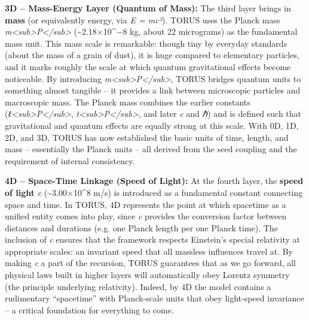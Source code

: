\documentclass[
]{article}
\begin{document}
\textbf{3D -- Mass-Energy Layer (Quantum of Mass):} The third layer
brings in \textbf{mass} (or equivalently energy, via \emph{E = mc²}).
TORUS uses the Planck mass
\emph{m\textless sub\textgreater P\textless/sub\textgreater{}}
(\textasciitilde2.18×10\^{}−8 kg, about 22 micrograms) as the
fundamental mass unit. This mass scale is remarkable: though tiny by
everyday standards (about the mass of a grain of dust), it is huge
compared to elementary particles, and it marks roughly the scale at
which quantum gravitational effects become noticeable. By introducing
\emph{m\textless sub\textgreater P\textless/sub\textgreater{}}, TORUS
bridges quantum units to something almost tangible -- it provides a link
between microscopic particles and macroscopic mass. The Planck mass
combines the earlier constants
(\emph{ℓ\textless sub\textgreater P\textless/sub\textgreater{}},
\emph{t\textless sub\textgreater P\textless/sub\textgreater{}}, and
later \emph{c} and \emph{ℏ}) and is defined such that gravitational and
quantum effects are equally strong at this scale. With 0D, 1D, 2D, and
3D, TORUS has now established the basic units of time, length, and mass
-- essentially the Planck units -- all derived from the seed coupling
and the requirement of internal consistency.

\textbf{4D -- Space-Time Linkage (Speed of Light):} At the fourth layer,
the \textbf{speed of light} \emph{c} (\textasciitilde3.00×10\^{}8 m/s)
is introduced as a fundamental constant connecting space and time. In
TORUS, 4D represents the point at which spacetime as a unified entity
comes into play, since \emph{c} provides the conversion factor between
distances and durations (e.g. one Planck length per one Planck time).
The inclusion of \emph{c} ensures that the framework respects Einstein's
special relativity at appropriate scales: an invariant speed that all
massless influences travel at. By making \emph{c} a part of the
recursion, TORUS guarantees that as we go forward, all physical laws
built in higher layers will automatically obey Lorentz symmetry (the
principle underlying relativity). Indeed, by 4D the model contains a
rudimentary ``spacetime'' with Planck-scale units that obey light-speed
invariance -- a critical foundation for everything to come.
\end{document}
